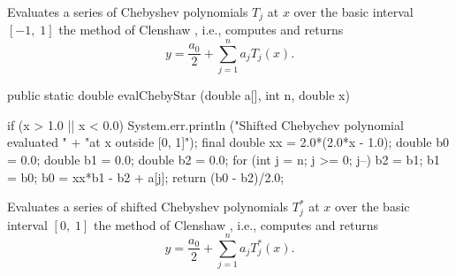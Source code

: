   \begin{tabb} Evaluates a series of Chebyshev polynomials $T_j$ at
  $x$ over the basic interval $[-1, \;1]$
   the method of Clenshaw
  \cite{mCLE62a}, i.e., computes and  returns
  \[
    y = \frac{a_0}2 + \sum_{j=1}^n a_j T_j (x).
  \]
\begin{htmlonly}
\end{htmlonly}
  \end{tabb}
\begin{code}

   public static double evalChebyStar (double a[], int n, double x) \begin{hide} {
      if (x > 1.0 || x < 0.0)
         System.err.println ("Shifted Chebychev polynomial evaluated " +
                             "at x outside [0, 1]");
      final double xx = 2.0*(2.0*x - 1.0);
      double b0 = 0.0;
      double b1 = 0.0;
      double b2 = 0.0;
      for (int j = n; j >= 0; j--) {
         b2 = b1;
         b1 = b0;
         b0 = xx*b1 - b2 + a[j];
      }
      return (b0 - b2)/2.0;
   }\end{hide}
\end{code}
  \begin{tabb} Evaluates a series of shifted Chebyshev polynomials $T_j^*$
   at $x$ over the basic interval $ [0, \;1]$
   the method of Clenshaw \cite{mCLE62a}, i.e., computes and  returns
  \[
    y = \frac{a_0}2 + \sum_{j=1}^n a_j T_j^* (x).
  \]
\begin{htmlonly}
\end{htmlonly}
  \end{tabb}
